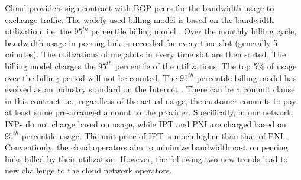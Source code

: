 

Cloud providers sign contract with BGP peers for the  bandwidth usage to exchange traffic. The widely used billing model is based on the bandwidth utilization, i.e. the $95^{th}$ percentile billing model \cite{hong2013achieving}. Over the monthly billing cycle, bandwidth usage in peering link is recorded for every time slot (generally 5 minutes). 
The utilizations of megabits in every time slot are then sorted. The billing model charges the $95^{th}$ percentile of the utilizations. The top 5\% of usage over the billing period will not be counted. The $95^{th}$ percentile billing model has evolved as an industry standard on the Internet \cite{singh2021costCascara}. There can be a commit clause in this contract i.e., regardless of the actual usage, the customer commits to pay at least some pre-arranged amount to the provider. Specifically, in our network, IXPs do not charge based on usage, while IPT and PNI are charged based on $95^{th}$ percentile usage. The unit price of IPT is much higher than that of PNI. Conventionly, the cloud operators aim to minimize bandwidth cost on peering links billed by their utilization. However, the following two new trends lead to new challenge to the cloud network operators.



